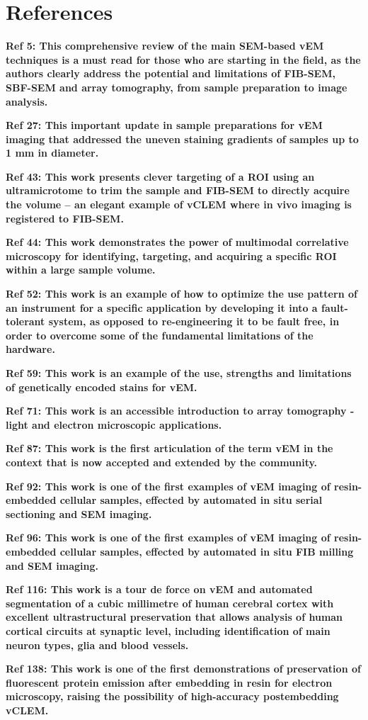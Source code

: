 \documentclass{article}
\begin{document}
\section*{References}
\begin{hangpars}

\textbf{Ref 5: This comprehensive review of the main SEM-based vEM techniques is a must read for those who are starting in the field, as the authors clearly address the potential and limitations of FIB-SEM, SBF-SEM and array tomography, from sample preparation to image analysis.}

\textbf{Ref 27: This important update in sample preparations for vEM imaging that addressed the uneven staining gradients of samples up to 1 mm in diameter.}

\textbf{Ref 43: This work presents clever targeting of a ROI using an ultramicrotome to trim the sample and FIB-SEM to directly acquire the volume – an elegant example of vCLEM where in vivo imaging is registered to FIB-SEM.}

\textbf{Ref 44: This work demonstrates the power of multimodal correlative microscopy for identifying, targeting, and acquiring a specific ROI within a large sample volume.}

\textbf{Ref 52: This work is an example of how to optimize the use pattern of an instrument for a specific application by developing it into a fault-tolerant system, as opposed to re-engineering it to be fault free, in order to overcome some of the fundamental limitations of the hardware.}

\textbf{Ref 59: This work is an example of the use, strengths and limitations of genetically encoded stains for vEM.}

\textbf{Ref 71: This work is an accessible introduction to array tomography - light and electron microscopic applications.}

\textbf{Ref 87: This work is the first articulation of the term vEM in the context that is now accepted and extended by the community.}

\textbf{Ref 92: This work is one of the first examples of vEM imaging of resin-embedded cellular samples, effected by automated in situ serial sectioning and SEM imaging.}

\textbf{Ref 96: This work is one of the first examples of vEM imaging of resin-embedded cellular samples, effected by automated in situ FIB milling and SEM imaging.}

\textbf{Ref 116: This work is a tour de force on vEM and automated segmentation of a cubic millimetre of human cerebral cortex with excellent ultrastructural preservation that allows analysis of human cortical circuits at synaptic level, including identification of main neuron types, glia and blood vessels.}

\textbf{Ref 138: This work is one of the first demonstrations of preservation of fluorescent protein emission after embedding in resin for electron microscopy, raising the possibility of high-accuracy postembedding vCLEM.}
\end{hangpars}
\end{document}
